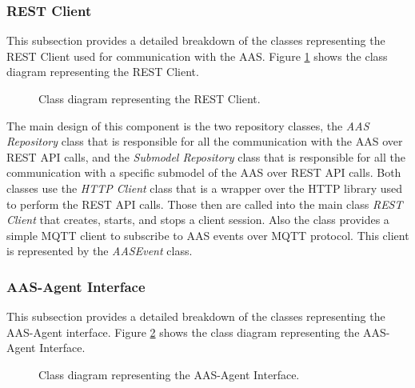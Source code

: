 \newpage
\subsubsection{REST Client}
This subsection provides a detailed breakdown of the classes representing the REST Client used for communication with the AAS.
Figure \ref{fig:rest_client_classes} shows the class diagram representing the REST Client.
\begin{figure}[ht]
    \centering
    
    \caption{Class diagram representing the REST Client.}
    \label{fig:rest_client_classes}
\end{figure}

The main design of this component is the two repository classes, the \emph{AAS Repository} class that is responsible for all the communication with the AAS over REST API calls, and the \emph{Submodel Repository} class that is responsible for all the communication with a specific submodel of the AAS over REST API calls.
Both classes use the \emph{HTTP Client} class that is a wrapper over the HTTP library used to perform the REST API calls.
Those then are called into the main class \emph{REST Client} that creates, starts, and stops a client session.
Also the class provides a simple MQTT client to subscribe to AAS events over MQTT protocol.
This client is represented by the \emph{AASEvent} class.

\newpage
\subsubsection{AAS-Agent Interface}
This subsection provides a detailed breakdown of the classes representing the AAS-Agent interface.
Figure \ref{fig:aas_agent_interface_classes} shows the class diagram representing the AAS-Agent Interface.
\begin{figure}[ht]
    \centering
    
    \caption{Class diagram representing the AAS-Agent Interface.}
    \label{fig:aas_agent_interface_classes}
\end{figure}

